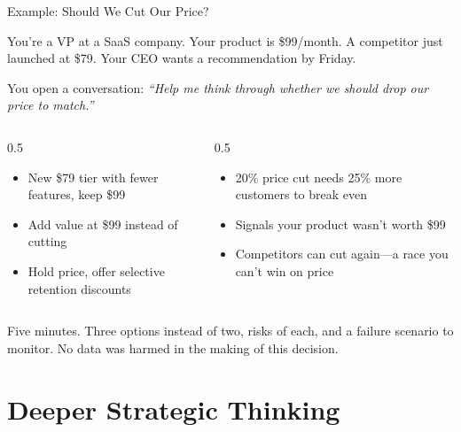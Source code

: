 \documentclass[aspectratio=169]{beamer}
\begin{document}
\begin{frame}[shrink=15]{Example: Should We Cut Our Price?}
\begin{shadedbox}[title=\textbf{The Scenario}]\scriptsize
You're a VP at a SaaS company.  Your product is \$99/month.  A competitor just launched at \$79.  Your CEO wants a recommendation by Friday.
\end{shadedbox}
\vspace{0.1cm}
\small You open a conversation: \textit{``Help me think through whether we should drop our price to match.''}
\vspace{0.1cm}
\begin{columns}[T]
\begin{column}{0.5\textwidth}
\begin{shadedbox}[title=\textbf{AI expands your options}]
\begin{itemize}\scriptsize
  \item New \$79 tier with fewer features, keep \$99
  \item Add value at \$99 instead of cutting
  \item Hold price, offer selective retention discounts
\end{itemize}
\end{shadedbox}
\end{column}
\begin{column}{0.5\textwidth}
\begin{shadedbox}[title=\textbf{AI challenges assumptions}]
\begin{itemize}\scriptsize
  \item 20\% price cut needs 25\% more customers to break even
  \item Signals your product wasn't worth \$99
  \item Competitors can cut again---a race you can't win on price
\end{itemize}
\end{shadedbox}
\end{column}
\end{columns}
\vspace{0.1cm}
\centering\small Five minutes.  Three options instead of two, risks of each, and a failure scenario to monitor.  \alert{No data was harmed in the making of this decision.}
\end{frame}

\section{Deeper Strategic Thinking}
\end{document}
